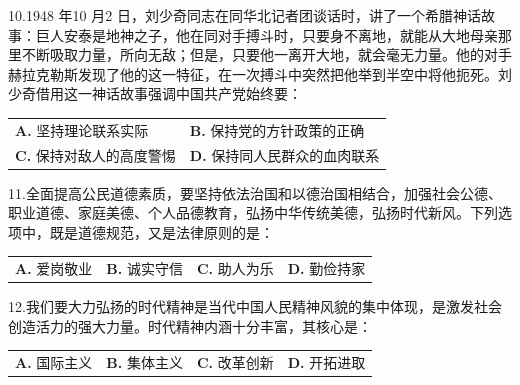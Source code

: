 \documentclass[UTF8,11pt]{ctexart}
\begin{document}
10.1948 年10 月2 日，刘少奇同志在同华北记者团谈话时，讲了一个希腊神话故事：巨人安泰是地神之子，他在同对手搏斗时，只要身不离地，就能从大地母亲那里不断吸取力量，所向无敌；但是，只要他一离开大地，就会毫无力量。他的对手赫拉克勒斯发现了他的这一特征，在一次搏斗中突然把他举到半空中将他扼死。刘少奇借用这一神话故事强调中国共产党始终要：


\begin{center}\begin{tabular}{>{\raggedright\arraybackslash}p{\dimexpr(\linewidth-4\tabcolsep)/2\relax}>{\raggedright\arraybackslash}p{\dimexpr(\linewidth-4\tabcolsep)/2\relax}}
\textbf{A.} 坚持理论联系实际 & \textbf{B.} 保持党的方针政策的正确\\[.35em]
\textbf{C.} 保持对敌人的高度警惕 & \textbf{D.} 保持同人民群众的血肉联系\\[.35em]\end{tabular}\end{center}

11.全面提高公民道德素质，要坚持依法治国和以德治国相结合，加强社会公德、职业道德、家庭美德、个人品德教育，弘扬中华传统美德，弘扬时代新风。下列选项中，既是道德规范，又是法律原则的是：


\begin{center}\begin{tabular}{>{\raggedright\arraybackslash}p{\dimexpr(\linewidth-8\tabcolsep)/4\relax}>{\raggedright\arraybackslash}p{\dimexpr(\linewidth-8\tabcolsep)/4\relax}>{\raggedright\arraybackslash}p{\dimexpr(\linewidth-8\tabcolsep)/4\relax}>{\raggedright\arraybackslash}p{\dimexpr(\linewidth-8\tabcolsep)/4\relax}}
\textbf{A.} 爱岗敬业 & \textbf{B.} 诚实守信 & \textbf{C.} 助人为乐 & \textbf{D.} 勤俭持家\\[.35em]\end{tabular}\end{center}

12.我们要大力弘扬的时代精神是当代中国人民精神风貌的集中体现，是激发社会创造活力的强大力量。时代精神内涵十分丰富，其核心是：


\begin{center}\begin{tabular}{>{\raggedright\arraybackslash}p{\dimexpr(\linewidth-8\tabcolsep)/4\relax}>{\raggedright\arraybackslash}p{\dimexpr(\linewidth-8\tabcolsep)/4\relax}>{\raggedright\arraybackslash}p{\dimexpr(\linewidth-8\tabcolsep)/4\relax}>{\raggedright\arraybackslash}p{\dimexpr(\linewidth-8\tabcolsep)/4\relax}}
\textbf{A.} 国际主义 & \textbf{B.} 集体主义 & \textbf{C.} 改革创新 & \textbf{D.} 开拓进取\\[.35em]\end{tabular}\end{center}
\end{document}
